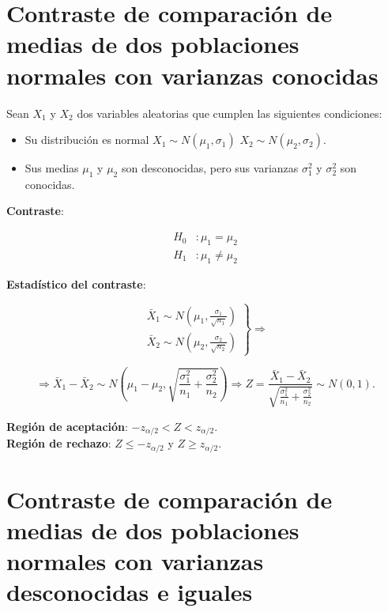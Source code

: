\documentclass[
  a4paper,
]{scrreport}
\providecommand{\tightlist}{%
  \setlength{\itemsep}{0pt}\setlength{\parskip}{0pt}}\usepackage{longtable,booktabs,array}
\theoremstyle{plain}
\theoremstyle{definition}
\theoremstyle{definition}
\theoremstyle{remark}
\begin{document}
\section{Contraste de comparación de medias de dos poblaciones normales
con varianzas
conocidas}\label{contraste-de-comparaciuxf3n-de-medias-de-dos-poblaciones-normales-con-varianzas-conocidas}

Sean \(X_1\) y \(X_2\) dos variables aleatorias que cumplen las
siguientes condiciones:

\begin{itemize}
\tightlist
\item
  Su distribución es normal \(X_1\sim N(\mu_1,\sigma_1)\)
  \(X_2\sim N(\mu_2,\sigma_2)\).
\item
  Sus medias \(\mu_1\) y \(\mu_2\) son desconocidas, pero sus varianzas
  \(\sigma^2_1\) y \(\sigma^2_2\) son conocidas.
\end{itemize}

\textbf{Contraste}:

\begin{align*}
H_0 &: \mu_1=\mu_2 \\
H_1 &: \mu_1\neq \mu_2
\end{align*}

\textbf{Estadístico del contraste}:

\[
\left.
\begin{array}{l}
\bar{X}_1\sim N\left(\mu_1,\frac{\sigma_1}{\sqrt{n_1}} \right) \\
\bar{X}_2\sim N\left(\mu_2,\frac{\sigma_2}{\sqrt{n_2}} \right)
\end{array}
\right\}
\Rightarrow
\]

\[
\Rightarrow
\bar{X}_1-\bar{X}_2 \sim N\left(\mu_1-\mu_2,\sqrt{\frac{\sigma^2_1}{n_1}+\frac{\sigma^2_2}{n_2}}\right)
\Rightarrow Z= \frac{\bar{X}_1-\bar{X}_2}{\sqrt{\frac{\sigma^2_1}{n_1}+\frac{\sigma^2_2}{n_2}}}\sim
N(0,1).
\]

\textbf{Región de aceptación}: \(-z_{\alpha/2}< Z < z_{\alpha/2}\).\\
\textbf{Región de rechazo}: \(Z\leq -z_{\alpha/2}\) y
\(Z\geq z_{\alpha/2}\).

\section{Contraste de comparación de medias de dos poblaciones normales
con varianzas desconocidas e
iguales}\label{contraste-de-comparaciuxf3n-de-medias-de-dos-poblaciones-normales-con-varianzas-desconocidas-e-iguales}
\end{document}
